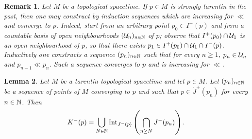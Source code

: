 \documentclass[a4paper,twoside]{article}
\newtheorem{lem}{Lemma}[section]
\newtheorem{rem}[lem]{Remark}
\begin{document}
\begin{rem}\label{rem:suite_croissante} Let $M$ be a topological spacetime. If $p\in M$ is strongly tarentin in the past, then one may construct
by induction sequences which are increasing for $\ll$ and converge to $p$. Indeed, start from an arbitrary point $p_0\in I^-(p)$ and from a countable basis of
open neighbourhoods $(\mathcal{U}_n)_{n\in \mathbb{N}}$ of $p$;
observe that $I^+(p_0)\cap \mathcal{U}_1$ is an open neighbourhood of $p$, so that there exists $p_1\in I^+(p_0)\cap \mathcal{U}_1\cap I^-(p)$.
Inductively one constructs a sequence $(p_n)_{n\in \mathbb{N}}$ such that for every $n\geq 1$,
$p_n\in \mathcal{U}_n$ and $p_{n-1}\ll p_n$. Such a sequence converges to $p$ and is increasing for $\ll$.
\end{rem}

\begin{lem}\label{lem:K_facile}Let $M$ be a tarentin topological spacetime and let $p\in M$.
Let $(p_n)_{n\in \mathbb{N}}$ be a sequence of points of $M$ converging to $p$ and such that $p\in \ring J^{+}(p_n)$ for every $n\in \mathbb{N}$.
Then
$$K^-(p) = \bigcup_{N\in \mathbb{N}} \mathrm{Int}_{J^-(p)}\left(\bigcap_{n\geq N} J^-(p_n)\right).$$
\end{lem}
\end{document}
